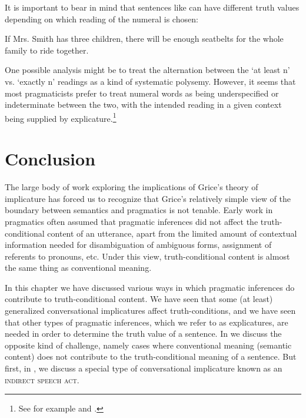 It is important to bear in mind that sentences like  can have different truth values depending on which reading of the numeral is chosen:


\ea \label{ex:9.34}
If Mrs. Smith has three children, there will be enough seatbelts for the whole family to ride together.
\z


One possible analysis might be to treat the alternation between the ‘at least n’ vs. ‘exactly n’ readings as a kind of systematic polysemy. However, it seems that most pragmaticists prefer to treat numeral words as being underspecified or indeterminate between the two, with the intended reading in a given context being supplied by explicature.\footnote{See for example \citet{Horn1992} and \citet{Carston1998}.}


\section{Conclusion}\label{sec:9.5}

The large body of work exploring the implications of Grice’s theory of implicature has forced us to recognize that Grice’s relatively simple view of the boundary between semantics and pragmatics is not tenable. Early work in pragmatics often assumed that pragmatic inferences did not affect the truth-conditional content of an utterance, apart from the limited amount of contextual information needed for disambiguation of ambiguous forms, assignment of referents to pronouns, etc. Under this view, truth-conditional content is almost the same thing as conventional meaning.



In this chapter we have discussed various ways in which pragmatic inferences do contribute to truth-conditional content. We have seen that some (at least) generalized conversational implicatures affect truth-conditions, and we have seen that other types of pragmatic inferences, which we refer to as explicatures, are needed in order to determine the truth value of a sentence. In  we discuss the opposite kind of challenge, namely cases where conventional meaning (semantic content) does not contribute to the truth-conditional meaning of a sentence. But first, in , we discuss a special type of conversational implicature known as an \textsc{indirect speech act}.




